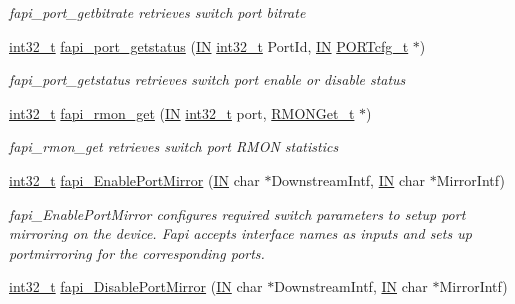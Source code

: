 \begin{DoxyCompactItemize}
\begin{DoxyCompactList}\small\item\em fapi\-\_\-port\-\_\-getbitrate retrieves switch port bitrate \end{DoxyCompactList}\item 
\hyperlink{commondefs_8h_a32f2e37ee053cf2ce8ca28d1f74630e5}{int32\-\_\-t} \hyperlink{group__FAPI__SYSTEM_ga1c00001736325df93b29cfe83646bc81}{fapi\-\_\-port\-\_\-getstatus} (\hyperlink{group__LIBHELP_gac2bbd6d630a06a980d9a92ddb9a49928}{I\-N} \hyperlink{commondefs_8h_a32f2e37ee053cf2ce8ca28d1f74630e5}{int32\-\_\-t} Port\-Id, \hyperlink{group__LIBHELP_gac2bbd6d630a06a980d9a92ddb9a49928}{I\-N} \hyperlink{structPORTcfg__t}{P\-O\-R\-Tcfg\-\_\-t} $\ast$)
\begin{DoxyCompactList}\small\item\em fapi\-\_\-port\-\_\-getstatus retrieves switch port enable or disable status \end{DoxyCompactList}\item 
\hyperlink{commondefs_8h_a32f2e37ee053cf2ce8ca28d1f74630e5}{int32\-\_\-t} \hyperlink{group__FAPI__SYSTEM_gabd8d89e98f29666e552f9917a85e1929}{fapi\-\_\-rmon\-\_\-get} (\hyperlink{group__LIBHELP_gac2bbd6d630a06a980d9a92ddb9a49928}{I\-N} \hyperlink{commondefs_8h_a32f2e37ee053cf2ce8ca28d1f74630e5}{int32\-\_\-t} port, \hyperlink{structRMONGet__t}{R\-M\-O\-N\-Get\-\_\-t} $\ast$)
\begin{DoxyCompactList}\small\item\em fapi\-\_\-rmon\-\_\-get retrieves switch port R\-M\-O\-N statistics \end{DoxyCompactList}\item 
\hyperlink{commondefs_8h_a32f2e37ee053cf2ce8ca28d1f74630e5}{int32\-\_\-t} \hyperlink{group__FAPI__SYSTEM_ga3fa20d5a5575b487abd15bc614053739}{fapi\-\_\-\-Enable\-Port\-Mirror} (\hyperlink{group__LIBHELP_gac2bbd6d630a06a980d9a92ddb9a49928}{I\-N} char $\ast$Downstream\-Intf, \hyperlink{group__LIBHELP_gac2bbd6d630a06a980d9a92ddb9a49928}{I\-N} char $\ast$Mirror\-Intf)
\begin{DoxyCompactList}\small\item\em fapi\-\_\-\-Enable\-Port\-Mirror configures required switch parameters to setup port mirroring on the device. Fapi accepts interface names as inputs and sets up portmirroring for the corresponding ports. \end{DoxyCompactList}\item 
\hyperlink{commondefs_8h_a32f2e37ee053cf2ce8ca28d1f74630e5}{int32\-\_\-t} \hyperlink{group__FAPI__SYSTEM_ga5021100190c76ee6290539f32cbcd77c}{fapi\-\_\-\-Disable\-Port\-Mirror} (\hyperlink{group__LIBHELP_gac2bbd6d630a06a980d9a92ddb9a49928}{I\-N} char $\ast$Downstream\-Intf, \hyperlink{group__LIBHELP_gac2bbd6d630a06a980d9a92ddb9a49928}{I\-N} char $\ast$Mirror\-Intf)

\end{DoxyCompactItemize}
